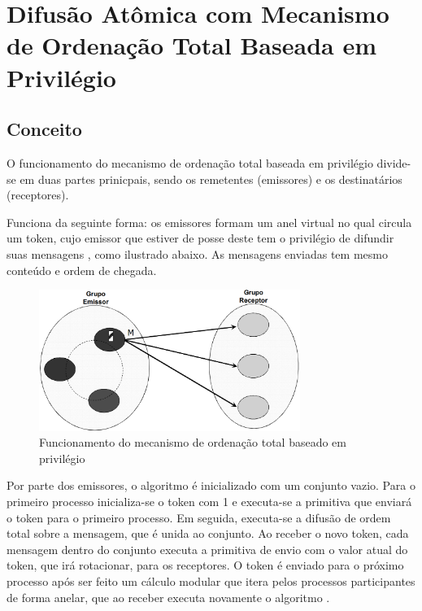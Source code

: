 \documentclass[10pt,conference]{IEEEtran}
\begin{document}


\section{Difusão Atômica com Mecanismo de Ordenação Total Baseada em Privilégio}
\subsection{Conceito}
O funcionamento do mecanismo de ordenação total baseada em privilégio divide-se em duas partes prinicpais, sendo os remetentes (emissores) e os destinatários (receptores). 

Funciona da seguinte forma: os emissores formam um anel virtual no qual circula um token, cujo emissor que estiver de posse deste tem o privilégio de difundir suas mensagens \cite{compdistlau}, como ilustrado abaixo. As mensagens enviadas tem mesmo conteúdo e ordem de chegada.

\begin{figure} [h]
    \centering
    \includegraphics[width=8.5cm]{images/baseadoempriv.png}
    \caption{Funcionamento do mecanismo de ordenação total baseado em privilégio} 
    \label{fig:enter-label}
\end{figure}

Por parte dos emissores, o algoritmo é inicializado com um conjunto vazio. Para o primeiro processo inicializa-se o token com 1 e executa-se a primitiva que enviará o token para o primeiro processo. Em seguida, executa-se a difusão de ordem total sobre a mensagem, que é unida ao conjunto. Ao receber o novo token, cada mensagem dentro do conjunto executa a primitiva de envio com o valor atual do token, que irá rotacionar, para os receptores. O token é enviado para o próximo processo após ser feito um cálculo modular que itera pelos processos participantes de forma anelar, que ao receber executa novamente o algoritmo \cite{defago2000totally}. 
\end{document}
